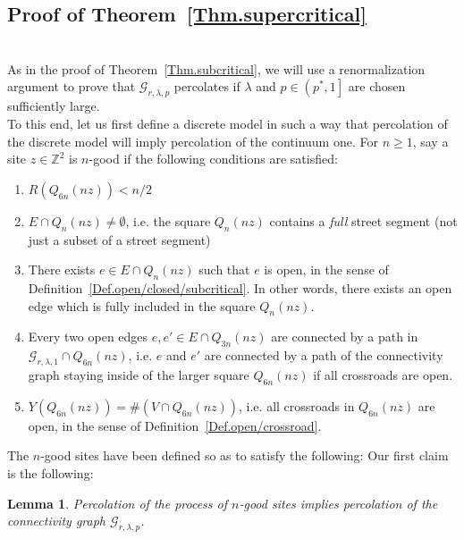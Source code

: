 \documentclass[10pt,a4paper]{amsart}
\theoremstyle{exampstyle}
\newtheorem{Lemma}{Lemma}
\theoremstyle{exampnotations}
\begin{document}
\subsection{Proof of Theorem~\ref{Thm.supercritical}}\mbox{}\\
As in the proof of Theorem~\ref{Thm.subcritical}, we will use a renormalization argument to prove that $\mathcal{G}_{r, \lambda, p}$ percolates if $\lambda$ and $p \in \left(p^{*},1\right]$ are chosen sufficiently large. \\
To this end, let us first define a discrete model in such a way that percolation of the discrete model will imply percolation of the continuum one. For $n \geq 1$, say a site $z \in \mathbb{Z}^{2}$ is $n$-good if the following conditions are satisfied:
\begin{enumerate}
\item $R(Q_{6n}(nz)) < n/2$
\item $E \cap Q_n(nz) \neq \emptyset$, i.e. the square $Q_n(nz)$ contains a \emph{full} street segment (not just a subset of a street segment)
\item There exists $e \in E \cap Q_n(nz)$ such that $e$ is open, in the sense of Definition~\ref{Def.open/closed/subcritical}. In other words, there exists an open edge which is fully included in the square $Q_n(nz)$.
\item Every two open edges $e,e' \in E \cap Q_{3n}(nz)$ are connected by a path in $\mathcal{G}_{r,\lambda,1}\cap Q_{6n}(nz)$, i.e. $e$ and $e'$ are connected by a path of the connectivity graph staying inside of the larger square $Q_{6n}(nz)$ if all crossroads are open.
\item $Y(Q_{6n}(nz)) = \#(V \cap Q_{6n}(nz))$, i.e. all crossroads in $Q_{6n}(nz)$ are open, in the sense of Definition~\ref{Def.open/crossroad}.
\end{enumerate}
The $n$-good sites have been defined so as to satisfy the following:
Our first claim is the following:
\begin{Lemma}
\label{Claim1.supercritical}
Percolation of the process of $n$-good sites implies percolation of the connectivity graph $\mathcal{G}_{r, \lambda,p}$.
\end{Lemma}
\end{document}
